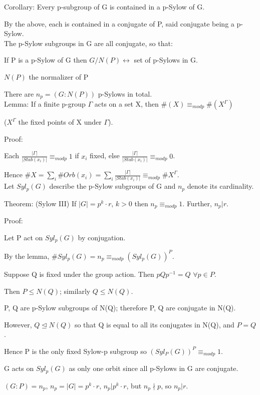\documentclass[12pt]{article}
\newcommand{\inv}{^{-1}}
\begin{document}
\noindent
Corollary: Every p-subgroup of G is contained in a p-Sylow of G.

By the above, each is contained in a conjugate of P, said conjugate being a p-Sylow.\\

\noindent
The p-Sylow subgroups in G are all conjugate, so that:

If P is a p-Sylow of G then $G/N(P) \leftrightarrow$ set of p-Sylows in G.

$N(P)$ the normalizer of P

There are $n_p = (G: N(P))$ p-Sylows in total.\\

\noindent
Lemma: If a finite p-group $\Gamma$ acts on a set X, then $\#(X) \equiv_{mod p} \#(X^{\Gamma})$

($X^{\Gamma}$ the fixed points of X under $\Gamma$).

\noindent
Proof:

Each $\frac{|\Gamma|}{|Stab(x_i)|} \equiv_{mod p} 1$ if $x_i$ fixed, else $\frac{|\Gamma|}{|Stab(x_i)|} \equiv_{mod p} 0$.

Hence $\#X = \sum_i \#Orb(x_i) = \sum_i \frac{|\Gamma|}{|Stab(x_i)|} \equiv_{mod p} \#X^{\Gamma}$.\\

\noindent
Let $Syl_p(G)$ describe the p-Sylow subgroups of G and $n_p$ denote its cardinality.

\noindent
Theorem: (Sylow III) If $|G|= p^k \cdot r$, $k > 0$ then $n_p \equiv_{mod p} 1$.  Further, $n_p | r$.

\noindent
Proof:

Let P act on $Syl_p(G)$ by conjugation.

By the lemma, $\#Syl_p(G) = n_p \equiv_{mod p} (Syl_p(G))^P$.

Suppose Q is fixed under the group action.  Then $pQp\inv = Q$ $\forall p \in P$.

Then $P \leq N(Q)$; similarly $Q \leq N(Q)$.

P, Q are p-Sylow subgroups of N(Q); therefore P, Q are conjugate in N(Q).

However, $Q \trianglelefteq N(Q)$ so that Q is equal to all its conjugates in N(Q), and $P = Q$.

Hence P is the only fixed Sylow-p subgroup so $(Syl_P(G))^P \equiv_{mod p} 1$.

G acts on $Syl_p(G)$ as only one orbit since all p-Sylows in G are conjugate.

$(G : P) = n_p$, $n_p = |G| = p^k \cdot r$, $n_p | p^k \cdot r$, but $n_p \nmid p$, so $n_p | r$.
\end{document}
